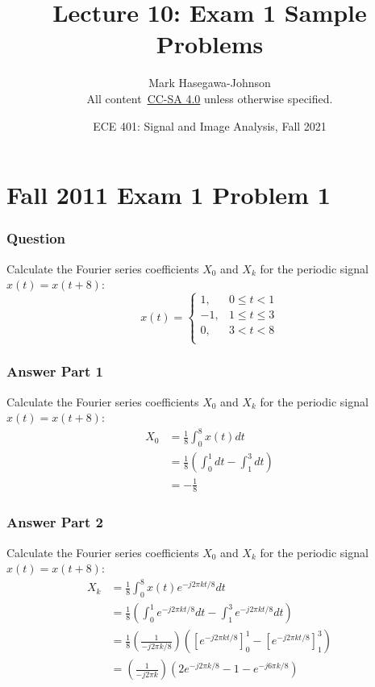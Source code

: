 \documentclass{beamer}
\title{Lecture 10: Exam 1 Sample Problems}
\author{Mark Hasegawa-Johnson\\All content~\href{https://creativecommons.org/licenses/by-sa/4.0/}{CC-SA 4.0} unless otherwise specified.}
\date{ECE 401: Signal and Image Analysis, Fall 2021}
\begin{document}
\begin{frame}
  \maketitle
\end{frame}

\begin{frame}
  \tableofcontents
\end{frame}

\section[11x1p1]{Fall 2011 Exam 1 Problem 1}
\setcounter{subsection}{1}

\begin{frame}
  \frametitle{Question}

  Calculate the Fourier series coefficients $X_0$ and $X_k$ for the
  periodic signal $x(t)=x(t+8)$:
  \[
  x(t)=\left\{\begin{array}{ll}
  1,& 0\le t < 1\\
  -1,& 1\le t\le 3\\
  0,& 3<t<8 \\
  \end{array}\right.
  \]
\end{frame}

\begin{frame}
  \frametitle{Answer Part 1}

  Calculate the Fourier series coefficients $X_0$ and $X_k$ for the
  periodic signal $x(t)=x(t+8)$:
  \begin{align*}
    X_0 &= \frac{1}{8}\int_0^8 x(t)dt\\
    &= \frac{1}{8}\left(\int_0^1 dt-\int_1^3 dt\right)\\
    &=-\frac{1}{8}
  \end{align*}
\end{frame}

\begin{frame}
  \frametitle{Answer Part 2}

  Calculate the Fourier series coefficients $X_0$ and $X_k$ for the
  periodic signal $x(t)=x(t+8)$:
  \begin{align*}
    X_k &= \frac{1}{8}\int_0^8 x(t)e^{-j2\pi kt/8}dt\\
    &= \frac{1}{8}\left(\int_0^1 e^{-j2\pi kt/8}dt-\int_1^3 e^{-j2\pi kt/8}dt\right)\\
    &=\frac{1}{8}\left(\frac{1}{-j2\pi k/8}\right)\left(\left[e^{-j2\pi kt/8}\right]_0^1-\left[e^{-j2\pi kt/8}\right]_1^3\right)\\
    &=\left(\frac{1}{-j2\pi k}\right)\left(2e^{-j2\pi k/8}-1-e^{-j6\pi k/8}\right)
  \end{align*}
\end{frame}
\end{document}
